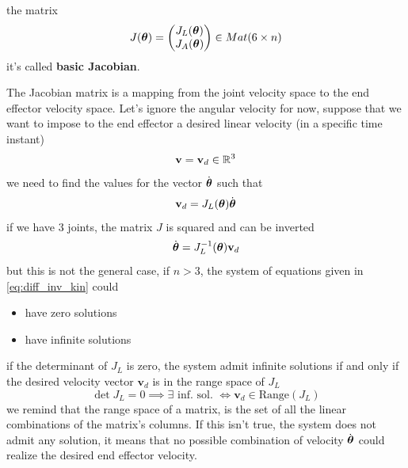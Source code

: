 \documentclass[10pt, letterpaper]{report}
\begin{document}
the matrix\begin{equation}
    J({\boldsymbol{\theta}})=\begin{pmatrix}
        J_L({\boldsymbol{\theta}})\\
        J_A({\boldsymbol{\theta}})
    \end{pmatrix}\in Mat(6\times n)
\end{equation}
it's called \textbf{basic Jacobian}.\bigskip

The Jacobian matrix is a mapping from the joint velocity space to the end effector velocity space. Let's ignore the angular velocity for now, suppose that we want to impose to the end effector a desired linear velocity (in a specific time instant)\begin{equation}
    \mathbf v=\mathbf v_d\in{\mathbb R}^3
\end{equation}
we need to find the values for the vector $\dot{{\boldsymbol{\theta}}}$ such that \begin{equation}\label{eq:diff_inv_kin}
    \mathbf v_d=J_L({\boldsymbol{\theta}})\dot{{\boldsymbol{\theta}}}
\end{equation}
if we have 3 joints, the matrix $J$ is squared and can be inverted\begin{equation}
    \dot{{\boldsymbol{\theta}}}=J_L^{-1}({\boldsymbol{\theta}}) \mathbf v_d
\end{equation}
but this is not the general case, if $n>3$, the system of equations given in \eqref{eq:diff_inv_kin} could\begin{itemize}
    \item have zero solutions
    \item have infinite solutions
\end{itemize}
if the determinant of $J_L$ is zero, the system admit infinite solutions if and only if the desired velocity vector $\mathbf v_d$ is in the range space of $J_L$\begin{equation}
    \det J_L=0\implies \exists \text{ inf. sol. }\iff   \mathbf v_d\in \text{Range}(J_L)
\end{equation}
we remind that the range space of a matrix, is the set of all the linear combinations of the matrix's columns. If this isn't true, the system does not admit any solution, it means that no possible combination of velocity $\dot{{\boldsymbol{\theta}}}$ could realize the desired end effector velocity. 
\end{document}
